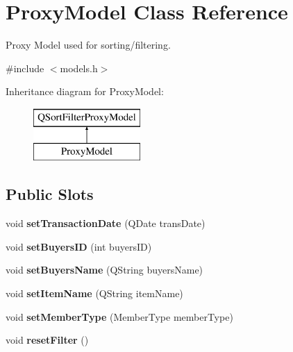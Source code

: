 \hypertarget{class_proxy_model}{}\section{Proxy\+Model Class Reference}
\label{class_proxy_model}


Proxy Model used for sorting/filtering.  




{\ttfamily \#include $<$models.\+h$>$}

Inheritance diagram for Proxy\+Model\+:\begin{figure}[H]
\begin{center}
\leavevmode
\includegraphics[height=2.000000cm]{class_proxy_model}
\end{center}
\end{figure}
\subsection*{Public Slots}
\begin{DoxyCompactItemize}
\item 
\mbox{\label{class_proxy_model_a8c3cd5525d76edb13d4655b02f1b4f53}} 
void {\bfseries set\+Transaction\+Date} (Q\+Date trans\+Date)
\item 
\mbox{\label{class_proxy_model_a6b207f08e2f082bd381853e9f0ffe94c}} 
void {\bfseries set\+Buyers\+ID} (int buyers\+ID)
\item 
\mbox{\label{class_proxy_model_a879ffef7c9b4d862631e34f95d361eed}} 
void {\bfseries set\+Buyers\+Name} (Q\+String buyers\+Name)
\item 
\mbox{\label{class_proxy_model_abc75683febee225bc7a3b7fd300ca7d1}} 
void {\bfseries set\+Item\+Name} (Q\+String item\+Name)
\item 
\mbox{\label{class_proxy_model_a49341f56f8b76b7d3510bc45baffc1d7}} 
void {\bfseries set\+Member\+Type} (Member\+Type member\+Type)
\item 
\mbox{\label{class_proxy_model_a9725fcef2eacae520140b65dac84ea89}} 
void {\bfseries reset\+Filter} ()
\end{DoxyCompactItemize}
